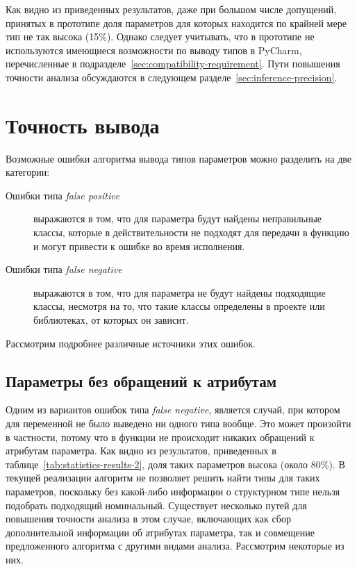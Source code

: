 Как видно из приведенных результатов, даже при большом числе допущений,
принятых в прототипе доля параметров для которых находится по крайней мере тип
не так высока (15\%).  Однако следует учитывать, что в прототипе не используются
имеющиеся возможности по выводу типов в PyCharm, перечисленные в
подразделе~\ref{sec:compatibility-requirement}.  Пути повышения точности анализа
обсуждаются в следующем разделе~\ref{sec:inference-precision}.

\section{Точность вывода}
\label{sec:inference-precision-analysis}

Возможные ошибки алгоритма вывода типов параметров можно разделить на две категории:
\begin{description}
    \item[Ошибки типа \emph{false positive}] выражаются в том, что для параметра
      будут найдены неправильные классы, которые в
      действительности не подходят для передачи в функцию и могут привести к
      ошибке во время исполнения.

    \item[Ошибки типа \emph{false negative}] выражаются в том, что для параметра
      не будут найдены подходящие классы, несмотря на то, что такие классы
      определены в проекте или библиотеках, от которых он зависит.

\end{description}

Рассмотрим подробнее различные источники этих ошибок.

\subsection{Параметры без обращений к атрибутам}
\label{sub:attributeless-parameters}

Одним из вариантов ошибок типа \emph{false negative}, является случай, при
котором для переменной не было выведено ни одного типа вообще. Это может
произойти в частности, потому что в функции не происходит никаких обращений к
атрибутам параметра. Как видно из результатов, приведенных в
таблице~\ref{tab:statistics-results-2}, доля таких параметров высока (около
80\%). В текущей реализации алгоритм не позволяет решить найти типы для таких
параметров, поскольку без какой-либо информации о структурном типе нельзя
подобрать подходящий номинальный. Существует несколько путей для повышения
точности анализа в этом случае, включающих как сбор дополнительной информации об
атрибутах параметра, так и совмещение предложенного алгоритма с другими видами
анализа. Рассмотрим некоторые из них.

